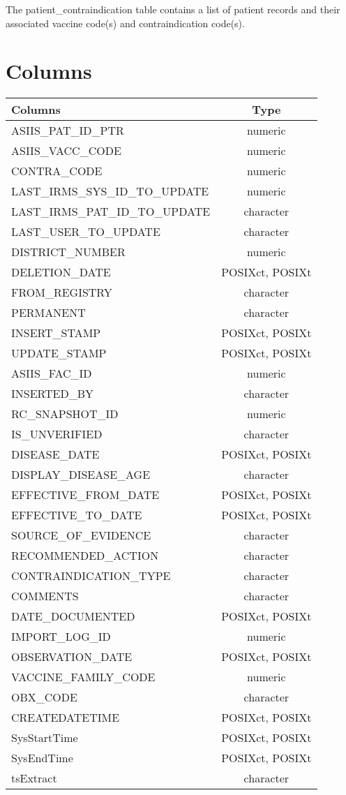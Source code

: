 \documentclass[
  letterpaper,
  DIV=11,
  numbers=noendperiod]{scrreprt}
\begin{document}
The patient\_contraindication table contains a list of patient records
and their associated vaccine code(s) and contraindication code(s).

\hypertarget{columns-26}{%
\section*{Columns}\label{columns-26}}

\begin{longtable}{lc}
\toprule
Columns & Type \\ 
\midrule
ASIIS\_PAT\_ID\_PTR & numeric \\ 
ASIIS\_VACC\_CODE & numeric \\ 
CONTRA\_CODE & numeric \\ 
LAST\_IRMS\_SYS\_ID\_TO\_UPDATE & numeric \\ 
LAST\_IRMS\_PAT\_ID\_TO\_UPDATE & character \\ 
LAST\_USER\_TO\_UPDATE & character \\ 
DISTRICT\_NUMBER & numeric \\ 
DELETION\_DATE & POSIXct, POSIXt \\ 
FROM\_REGISTRY & character \\ 
PERMANENT & character \\ 
INSERT\_STAMP & POSIXct, POSIXt \\ 
UPDATE\_STAMP & POSIXct, POSIXt \\ 
ASIIS\_FAC\_ID & numeric \\ 
INSERTED\_BY & character \\ 
RC\_SNAPSHOT\_ID & numeric \\ 
IS\_UNVERIFIED & character \\ 
DISEASE\_DATE & POSIXct, POSIXt \\ 
DISPLAY\_DISEASE\_AGE & character \\ 
EFFECTIVE\_FROM\_DATE & POSIXct, POSIXt \\ 
EFFECTIVE\_TO\_DATE & POSIXct, POSIXt \\ 
SOURCE\_OF\_EVIDENCE & character \\ 
RECOMMENDED\_ACTION & character \\ 
CONTRAINDICATION\_TYPE & character \\ 
COMMENTS & character \\ 
DATE\_DOCUMENTED & POSIXct, POSIXt \\ 
IMPORT\_LOG\_ID & numeric \\ 
OBSERVATION\_DATE & POSIXct, POSIXt \\ 
VACCINE\_FAMILY\_CODE & numeric \\ 
OBX\_CODE & character \\ 
CREATEDATETIME & POSIXct, POSIXt \\ 
SysStartTime & POSIXct, POSIXt \\ 
SysEndTime & POSIXct, POSIXt \\ 
tsExtract & character \\ 
\bottomrule
\end{longtable}
\end{document}
